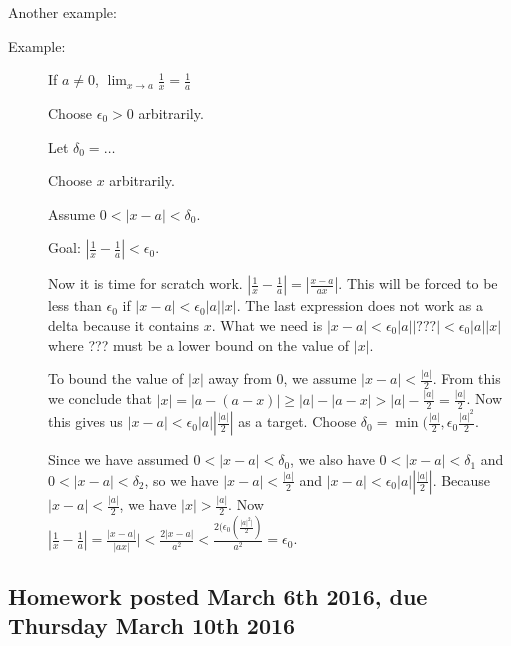 \documentclass[12pt]{article}
\begin{document}
Another example:  

\begin{description}


\item[Example:]  If $a \neq 0$,  $\lim_{x \rightarrow a} \frac1x=\frac 1a$

Choose $\epsilon_0>0$ arbitrarily.

Let $\delta_0=\ldots$

Choose $x$ arbitrarily.

Assume $0<|x-a|<\delta_0$.

Goal:  $|\frac 1x - \frac 1a|<\epsilon_0$.

Now it is time for scratch work.  $|\frac 1x - \frac 1a| = |\frac{x-a}{ax}|$.  This will be forced to be less than $\epsilon_0$
if $|x-a| < \epsilon_0|a||x|$.  The last expression does not work as a delta because it contains $x$.  What we need
is $|x-a| < \epsilon_0|a||???|< \epsilon_0|a||x|$ where ??? must be a lower bound on the value of $|x|$.

To bound the value of $|x|$ away from 0, we assume  $|x-a|<\frac{|a|}2$.  From this we conclude that $|x|=|a-(a-x)| \geq |a|-|a-x| > |a|-\frac{|a|}2 = \frac{|a|}2$.
Now this gives us $|x-a| < \epsilon_0|a||\frac{|a|}2|$  as a target.  Choose $\delta_0 = \min(\frac{|a|}2,\epsilon_0\frac{|a|^2}2$.

Since we have assumed $0<|x-a|<\delta_0$, we also have $0<|x-a|<\delta_1$ and $0<|x-a|<\delta_2$, so
we have  $|x-a|<\frac{|a|}2$  and $|x-a| < \epsilon_0|a||\frac{|a|}2|$.  Because $|x-a|<\frac{|a|}2$, we have
$|x|>\frac{|a|}2$.  Now $|\frac 1x - \frac 1a| = \frac{|x-a|}{|ax|}|< \frac{2|x-a|}{a^2} < 
\frac{2(\epsilon_0(\frac {|a|^2|}2)}{a^2}=\epsilon_0$.

\end{description}

\newpage

\subsection{Homework posted March 6th 2016, due Thursday March 10th 2016}
\end{document}
